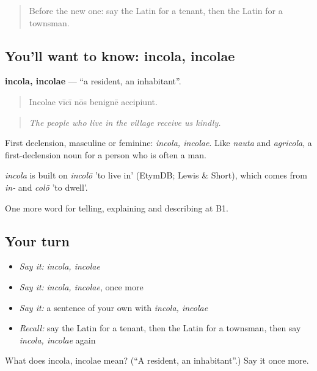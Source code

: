 \begin{quote}
Before the new one: say the Latin for a tenant, then the Latin for a townsman.
\end{quote}

\subsection*{You'll want to know: incola, incolae}
\textbf{incola, incolae} — \textquotedblleft{}a resident, an inhabitant\textquotedblright{}.

\begin{quote}
Incolae vīcī nōs benignē accipiunt.
\end{quote}

\begin{quote}
\emph{The people who live in the village receive us kindly.}
\end{quote}

First declension, masculine or feminine: \emph{incola, incolae}. Like \emph{nauta} and \emph{agricola}, a first-declension noun for a person who is often a man.

\begin{cousinweb}
\emph{incola} is built on \emph{incolō} 'to live in' (EtymDB; Lewis \& Short), which comes from \emph{in-} and \emph{colō} 'to dwell'.
\end{cousinweb}

\begin{grammarlens}[title={What you've built}]
One more word for telling, explaining and describing at B1.
\end{grammarlens}

\subsection*{Your turn}
\begin{itemize}
\raggedright
  \item \emph{Say it:} \emph{incola, incolae}
  \item \emph{Say it:} \emph{incola, incolae}, once more
  \item \emph{Say it:} a sentence of your own with \emph{incola, incolae}
  \item \emph{Recall:} say the Latin for a tenant, then the Latin for a townsman, then say \emph{incola, incolae} again
\end{itemize}

\begin{tcolorbox}[breakable,colback=teal!4,colframe=teal!35!black,title={Before you move on}]
What does incola, incolae mean? (\textquotedblleft{}A resident, an inhabitant\textquotedblright{}.) Say it once more.
\end{tcolorbox}
